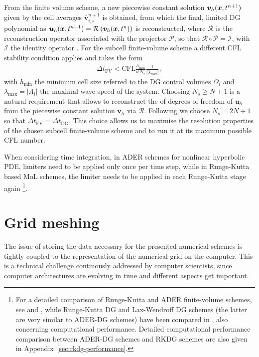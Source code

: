  From the finite volume scheme, a new piecewise constant solution $\boldsymbol{v}_h(\boldsymbol{x},
 t^{n+1})$ given by the cell averages $\bar{\boldsymbol{v}}_{i,s}^{n+1}$
 is obtained, from which the final, {limited} DG
 polynomial as $\boldsymbol{u}_h(\boldsymbol{x},t^{n+1}) = \mathcal{R}\left( \boldsymbol{v}_h(\boldsymbol{x},t^n) \right)
 $ is reconstructed, where $\mathcal{R}$ is the reconstruction operator associated with the
 projector $\mathcal{P}$, so that $\mathcal{R} \circ \mathcal{P} =
 \mathcal{I}$, with $\mathcal{I}$ the identity operator \cite{Dumbser2014}.
 For the subcell finite-volume scheme a different CFL stability condition
 applies and takes the form
 \begin{align}
 \Delta t_{\text{FV}} < \text{CFL}\frac{h_{\text{min}}}{d \, N_s}
 \frac{1}{|\lambda_{\text{max}}|}, \label{eq:CFLweno}
 \end{align}
 with $h_{\min}$ the minimum cell size referred to the DG control volumes
 $\Omega_i$ and $\lambda_\text{max}=|\Lambda_i|$ the maximal wave speed of the
 system. Choosing $N_s \geq N+1$ is a natural requirement that allows
 to reconstruct the of degrees of freedom of $\boldsymbol{u}_h$ from the piecewise
 constant solution $\boldsymbol{v}_h$ via $\mathcal{R}$. Following \cite{Dumbser2014}
 we choose $N_s = 2N + 1$ so that $\Delta t_{\text{FV}} = \Delta
 t_{\text{DG}}$. This choice allows us to maximise the resolution
 properties of the chosen subcell finite-volume scheme and to run it at
 its maximum possible CFL number. 


When considering time integration, in ADER schemes for nonlinear hyperbolic PDE,
limiters need to be applied only once per time step, while in Runge-Kutta based 
MoL schemes, the limiter needs to be applied in each Runge-Kutta 
stage again \footnote{
    For a detailed comparison of Runge-Kutta and ADER
	finite-volume schemes, see \cite{dumbser_diffapprox} and
	\cite{Balsara2013}, while Runge-Kutta DG and Lax-Wendroff DG schemes
	(the latter are very similar to ADER-DG schemes) have been compared in
	\cite{QiuDumbserShu}, also concerning computational performance. Detailed
	computational performance comparison between ADER-DG schemes and RKDG
	schemes are also given in Appendix~\vref{sec:rkdg-performance}.}.

\section{Grid meshing}\label{sec:grid-meshing}
The issue of storing the data necessary for the presented numerical schemes is
tightly coupled to the representation of the numerical grid on the computer. This is
a technical challenge continously addressed by computer scientists, since computer
architectures are evolving in time and different aspects get important.

